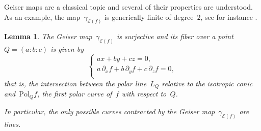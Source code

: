 \documentclass{amsart}
\theoremstyle{plain}
\newtheorem{lemma}{Lemma}[section]
\theoremstyle{definition}
\newcommand{\Eig}[1]{\mathcal{E}\!\left( {#1} \right)}
\begin{document}
Geiser maps are a classical topic and several of their properties are understood.
As an example, the map~$\gamma_{\Eig{f}}$ is generically finite of degree~$2$, see for instance \cite[Section~8.7.2]{Dolgachev}.

\begin{lemma}
The Geiser map~$\gamma_{\Eig{f}}$ is surjective and its fiber over a point $Q = (a:b:c)$ is given by
%
\begin{equation}
\label{eq:fibers}
  \left\{
  \begin{array}{l}
    a x + by + cz = 0, \\[2pt]
    a \, \partial_x f + b \, \partial_y f + c \, \partial_z f = 0,\\
  \end{array}
  \right.
\end{equation}
%
that is, the intersection between the polar line~$L_Q$ relative to the isotropic conic and~$\mathrm{Pol}_Q f$, the
first polar curve of~$f$ with respect to~$Q$.

In particular, the only possible curves contracted by the Geiser map~$\gamma_{\Eig{f}}$ are lines.
\end{lemma}
\end{document}
